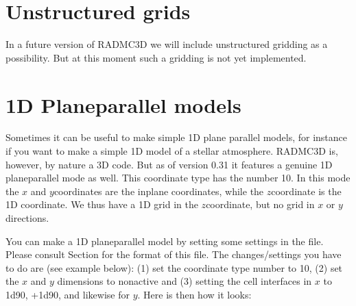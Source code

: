\documentclass[letterpaper,10pt,english]{sphinxmanual}
\begin{document}
\section{Unstructured grids}
\label{\detokenize{gridding:unstructured-grids}}\label{\detokenize{gridding:sec-unstruct-grids}}
In a future version of RADMC\sphinxhyphen{}3D we will include unstructured gridding as a
possibility. But at this moment such a gridding is not yet implemented.


\section{1\sphinxhyphen{}D Plane\sphinxhyphen{}parallel models}
\label{\detokenize{gridding:d-plane-parallel-models}}\label{\detokenize{gridding:sec-1d-plane-parallel}}
Sometimes it can be useful to make simple 1\sphinxhyphen{}D plane parallel models, for
instance if you want to make a simple 1\sphinxhyphen{}D model of a stellar atmosphere.
RADMC\sphinxhyphen{}3D is, however, by nature a 3\sphinxhyphen{}D code. But as of version 0.31 it features a
genuine 1\sphinxhyphen{}D plane\sphinxhyphen{}parallel mode as well. This coordinate type has the
number 10. In this mode the \(x\)\sphinxhyphen{} and \(y\)\sphinxhyphen{}coordinates are the
in\sphinxhyphen{}plane coordinates, while the \(z\)\sphinxhyphen{}coordinate is the 1\sphinxhyphen{}D coordinate.  We
thus have a 1\sphinxhyphen{}D grid in the \(z\)\sphinxhyphen{}coordinate, but no grid in \(x\)\sphinxhyphen{} or
\(y\)\sphinxhyphen{}directions.

You can make a 1\sphinxhyphen{}D plane\sphinxhyphen{}parallel model by setting some settings in the
 file. Please consult Section {\hyperref[\detokenize{inputoutputfiles:sec-grid-input}]{}} for the
format of this file. The changes/settings you have to do are (see example
below): (1) set the coordinate type number to 10, (2) set the \(x\) and
\(y\) dimensions to non\sphinxhyphen{}active and (3) setting the cell interfaces in
\(x\) to \sphinxhyphen{}1d90, +1d90, and likewise for \(y\). Here is then how it
looks:
\end{document}

